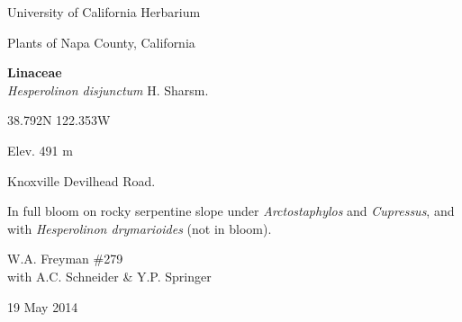 \documentclass[letterpaper,10pt]{article}
\begin{document}
\begin{minipage}[t]{0.40\textwidth}

\begin{center}
University of California Herbarium \\
\begin{large}
Plants of Napa County, California \\
\end{large}
\vspace{\baselineskip}
\textbf{Linaceae} \\
\textit{Hesperolinon disjunctum} H. Sharsm.\\
\end{center}

\begin{footnotesize}

\begin{multicols}{2}
38.792\textdegree N 122.353\textdegree W
\columnbreak
\begin{flushright}
Elev. 491 m
\end{flushright}
\end{multicols}

Knoxville Devilhead Road.
\vspace{\baselineskip}

In full bloom on rocky serpentine slope under \textit{Arctostaphylos} and \textit{Cupressus}, and with \textit{Hesperolinon drymarioides} (not in bloom).

\begin{multicols}{2}
W.A. Freyman \#279 \\
with A.C. Schneider \& Y.P. Springer
\columnbreak
\begin{flushright}
19 May 2014
\end{flushright}
\end{multicols}

\end{footnotesize}

\end{minipage}

\vspace{2cm}
%
%

%
%
\end{document}
